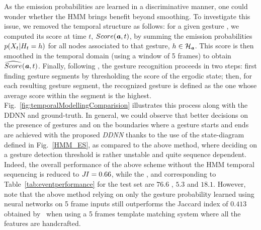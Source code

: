 %
As the emission probabilities are learned in a discriminative manner, one could  wonder whether the HMM brings benefit beyond smoothing.
To investigate this issue, we removed the temporal structure as follows:
for a given gesture \gesturea, we computed its score at time $t$, $Score(\textbf{\emph{a}},t)$, by summing the emission
probabilities $p(X_t|H_t = h)$ for all nodes associated to that gesture,
\ie $h \in \mathcal{H}_{\textbf{\emph{a}}}$.
%
This score is then smoothed in the temporal domain (using a window of 5 frames) to obtain $\widehat{Score}(\textbf{\emph{a}},t)$.
%
Finally, following \cite{neverova2014moddrop}, the gesture recognition proceeds in two steps:
first finding gesture segments by thresholding the score of the ergodic state;
then, for each resulting gesture segment, the recognized gesture is defined as the one whose average score within the segment is the highest.
%
Fig.~\ref{fig:temporalModellingComparision} illustrates this process along with the DDNN and ground-truth.
%
In general, we could observe that better decisions on the presence of gestures and on 
the boundaries where a gesture starts and ends are achieved with the proposed \emph{DDNN} 
thanks to  the use of the state-diagram defined in Fig.~\ref{HMM_ES}, as compared to the above method, 
where deciding on a gesture detection threshold is rather unstable and quite sequence dependent.
%
Indeed, the overall performance of the above scheme without the HMM temporal sequencing  is reduced to $J\hspace*{-0.1em}I= 0.66$, 
while the \eventaccuracy, \eventconfused and \eventmissed corresponding 
to Table~\ref{tab:eventperformance} for the test set are  $76.6$ , $5.3$ and $18.1$. 
%
%
However, note  that the above method relying on only the gesture probability learned
using neural networks on  5 frame inputs still outperforms the Jaccard index of $0.413$ 
obtained by~\cite{camgoz2014gesture} when using a 5 frames template matching system 
where all the features are handcrafted.





